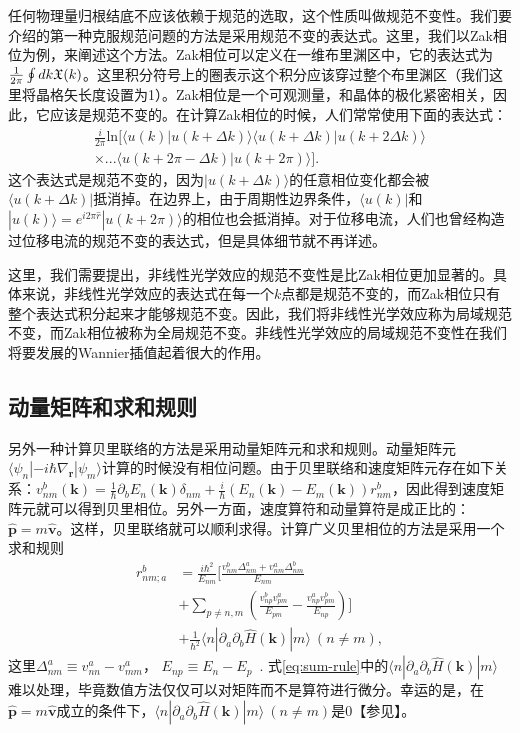 任何物理量归根结底不应该依赖于规范的选取，这个性质叫做规范不变性。我们要介绍的第一种克服规范问题的方法是采用规范不变的表达式。这里，我们以Zak相位\cite{zak_berrys_1989}为例，来阐述这个方法。Zak相位可以定义在一维布里渊区中，它的表达式为$\frac{1}{2\pi}\ointop dk\berry(k)$。这里积分符号上的圈表示这个积分应该穿过整个布里渊区（我们这里将晶格矢长度设置为1）。Zak相位是一个可观测量，和晶体的极化紧密相关\cite{king-smith_theory_1993,resta_theory_1992}，因此，它应该是规范不变的。在计算Zak相位的时候，人们常常使用下面的表达式：
\begin{align*}
\frac{i}{2\pi}\text{ln}[\langle u(k)|u(k+\Delta k)\rangle\langle u(k+\Delta k)|u(k+2\Delta k)\rangle\\
\times...\langle u(k+2\pi-\Delta k)|u(k+2\pi)\rangle].
\end{align*}
这个表达式是规范不变的，因为$|u(k+\Delta k)\rangle$的任意相位变化都会被$\langle u(k+\Delta k)|$抵消掉。在边界上，由于周期性边界条件，$\langle u(k)|$和$|u(k)\rangle=e^{i2\pi\hat{r}}|u(k+2\pi)\rangle$的相位也会抵消掉。对于位移电流，人们也曾经构造过位移电流的规范不变的表达式\cite{young2012}，但是具体细节就不再详述。


这里，我们需要提出，非线性光学效应的规范不变性是比Zak相位更加显著的。具体来说，非线性光学效应的表达式在每一个$k$点都是规范不变的，而Zak相位只有整个表达式积分起来才能够规范不变。因此，我们将非线性光学效应称为局域规范不变，而Zak相位被称为全局规范不变。非线性光学效应的局域规范不变性在我们将要发展的Wannier插值起着很大的作用。

\subsection{动量矩阵和求和规则}

另外一种计算贝里联络的方法是采用动量矩阵元和求和规则\cite{sipe_second-order_2000}。动量矩阵元$\langle\psi_{n}|-i\hbar\nabla_{\mathbf{r}}|\psi_{m}\rangle$计算的时候没有相位问题。由于贝里联络和速度矩阵元存在如下关系：$v_{nm}^{b}(\mathbf{k})=\frac{1}{\hbar}\partial_{b}E_{n}(\mathbf{k})\delta_{nm}+\frac{i}{\hbar}(E_{n}(\mathbf{k})-E_{m}(\mathbf{k}))r_{nm}^{b}$，因此得到速度矩阵元就可以得到贝里相位。另外一方面，速度算符和动量算符是成正比的：$\hat{\mathbf{p}}=m\hat{\mathbf{v}}$。这样，贝里联络就可以顺利求得。计算广义贝里相位的方法是采用一个求和规则
\begin{align}
r_{nm;a}^{b} & =\frac{i\hbar^{2}}{E_{nm}}[\frac{v_{nm}^{b}\Delta_{nm}^{a}+v_{nm}^{a}\Delta_{nm}^{b}}{E_{nm}}\nonumber \\
& +\sum_{p\ne n,m}(\frac{v_{np}^{b}v_{pm}^{a}}{E_{pm}}-\frac{v_{np}^{a}v_{pm}^{b}}{E_{np}})]\label{eq:sum-rule}\\ 
& +\frac{1}{\hbar^{2}}\langle n|\partial_{a}\partial_{b}\hat{H}(\mathbf{k})|m\rangle~(n\ne m)\nonumber,
\end{align}
这里$\Delta_{nm}^{a}\equiv v_{nn}^{a}-v_{mm}^{a}$， $E_{np}\equiv E_{n}-E_{p}$~\cite{cook_design_2017}.
式\ref{eq:sum-rule}中的$\langle n|\partial_{a}\partial_{b}\hat{H}(\mathbf{k})|m\rangle$难以处理，毕竟数值方法仅仅可以对矩阵而不是算符进行微分。幸运的是，在$\hat{\mathbf{p}}=m\hat{\mathbf{v}}$成立的条件下，$\langle n|\partial_{a}\partial_{b}\hat{H}(\mathbf{k})|m\rangle \  (n\ne m)$是0【参见】。


